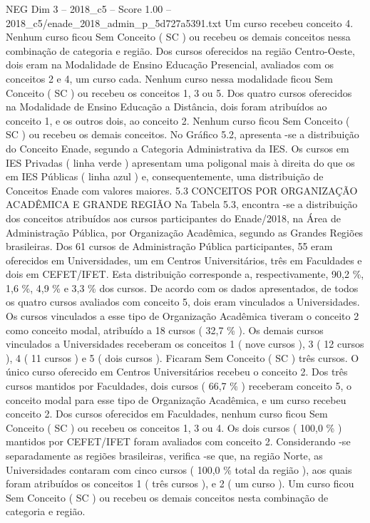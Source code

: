 \begin{textsample}{NEG Dim 3 – 2018\_c5 – Score 1.00 – 2018\_c5/enade\_2018\_admin\_p\_5d727a5391.txt}
Um curso recebeu conceito 4.
Nenhum curso ficou Sem Conceito ( SC ) ou recebeu os demais conceitos nessa combinação de categoria e região.
Dos cursos oferecidos na região Centro-Oeste, dois eram na Modalidade de Ensino Educação Presencial, avaliados com os conceitos 2 e 4, um curso cada.
Nenhum curso nessa modalidade ficou Sem Conceito ( SC ) ou recebeu os conceitos 1, 3 ou 5.
Dos quatro cursos oferecidos na Modalidade de Ensino Educação a Distância, dois foram atribuídos ao conceito 1, e os outros dois, ao conceito 2.
Nenhum curso ficou Sem Conceito ( SC ) ou recebeu os demais conceitos.
No Gráfico 5.2, apresenta -se a distribuição do Conceito Enade, segundo a Categoria Administrativa da IES.
Os cursos em IES Privadas ( linha verde ) apresentam uma poligonal mais à direita do que os em IES Públicas ( linha azul ) e, consequentemente, uma distribuição de Conceitos Enade com valores maiores. 5.3 CONCEITOS POR ORGANIZAÇÃO ACADÊMICA E GRANDE REGIÃO Na Tabela 5.3, encontra -se a distribuição dos conceitos atribuídos aos cursos participantes do Enade/2018, na Área de Administração Pública, por Organização Acadêmica, segundo as Grandes Regiões brasileiras.
Dos 61 cursos de Administração Pública participantes, 55 eram oferecidos em Universidades, um em Centros Universitários, três em Faculdades e dois em CEFET/IFET.
Esta distribuição corresponde a, respectivamente, 90,2 \%, 1,6 \%, 4,9 \% e 3,3 \% dos cursos.
De acordo com os dados apresentados, de todos os quatro cursos avaliados com conceito 5, dois eram vinculados a Universidades.
Os cursos vinculados a esse tipo de Organização Acadêmica tiveram o conceito 2 como conceito modal, atribuído a 18 cursos ( 32,7 \% ).
Os demais cursos vinculados a Universidades receberam os conceitos 1 ( nove cursos ), 3 ( 12 cursos ), 4 ( 11 cursos ) e 5 ( dois cursos ).
Ficaram Sem Conceito ( SC ) três cursos.
O único curso oferecido em Centros Universitários recebeu o conceito 2.
Dos três cursos mantidos por Faculdades, dois cursos ( 66,7 \% ) receberam conceito 5, o conceito modal para esse tipo de Organização Acadêmica, e um curso recebeu conceito 2.
Dos cursos oferecidos em Faculdades, nenhum curso ficou Sem Conceito ( SC ) ou recebeu os conceitos 1, 3 ou 4.
Os dois cursos ( 100,0 \% ) mantidos por CEFET/IFET foram avaliados com conceito 2.
Considerando -se separadamente as regiões brasileiras, verifica -se que, na região Norte, as Universidades contaram com cinco cursos ( 100,0 \% total da região ), aos quais foram atribuídos os conceitos 1 ( três cursos ), e 2 ( um curso ).
Um curso ficou Sem Conceito ( SC ) ou recebeu os demais conceitos nesta combinação de categoria e região.

\end{textsample}
